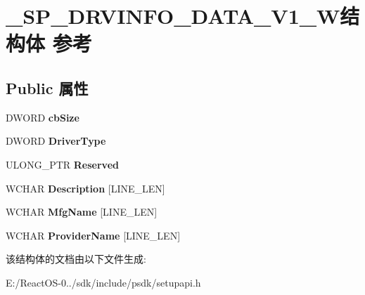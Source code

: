 \hypertarget{struct___s_p___d_r_v_i_n_f_o___d_a_t_a___v1___w}{}\section{\+\_\+\+S\+P\+\_\+\+D\+R\+V\+I\+N\+F\+O\+\_\+\+D\+A\+T\+A\+\_\+\+V1\+\_\+\+W结构体 参考}
\label{struct___s_p___d_r_v_i_n_f_o___d_a_t_a___v1___w}
\subsection*{Public 属性}
\begin{DoxyCompactItemize}
\item 
\mbox{\label{struct___s_p___d_r_v_i_n_f_o___d_a_t_a___v1___w_a28c9b8218e8d3c02428261767fb92fa5}} 
D\+W\+O\+RD {\bfseries cb\+Size}
\item 
\mbox{\label{struct___s_p___d_r_v_i_n_f_o___d_a_t_a___v1___w_aa09eff9d1e0198a857e2d863a2d9840f}} 
D\+W\+O\+RD {\bfseries Driver\+Type}
\item 
\mbox{\label{struct___s_p___d_r_v_i_n_f_o___d_a_t_a___v1___w_ab748e2b4188c66d6c61000e52bd6ce8b}} 
U\+L\+O\+N\+G\+\_\+\+P\+TR {\bfseries Reserved}
\item 
\mbox{\label{struct___s_p___d_r_v_i_n_f_o___d_a_t_a___v1___w_a4fc91b0f9a870a932f7e9225c533682b}} 
W\+C\+H\+AR {\bfseries Description} \mbox{[}L\+I\+N\+E\+\_\+\+L\+EN\mbox{]}
\item 
\mbox{\label{struct___s_p___d_r_v_i_n_f_o___d_a_t_a___v1___w_ac98809e4d3ece86c4f0d9c41439460a6}} 
W\+C\+H\+AR {\bfseries Mfg\+Name} \mbox{[}L\+I\+N\+E\+\_\+\+L\+EN\mbox{]}
\item 
\mbox{\label{struct___s_p___d_r_v_i_n_f_o___d_a_t_a___v1___w_a4b6b98b588a07ffb93ce61ba346d69f7}} 
W\+C\+H\+AR {\bfseries Provider\+Name} \mbox{[}L\+I\+N\+E\+\_\+\+L\+EN\mbox{]}
\end{DoxyCompactItemize}


该结构体的文档由以下文件生成\+:\begin{DoxyCompactItemize}
\item 
E\+:/\+React\+O\+S-\/0../sdk/include/psdk/setupapi.\+h\end{DoxyCompactItemize}
